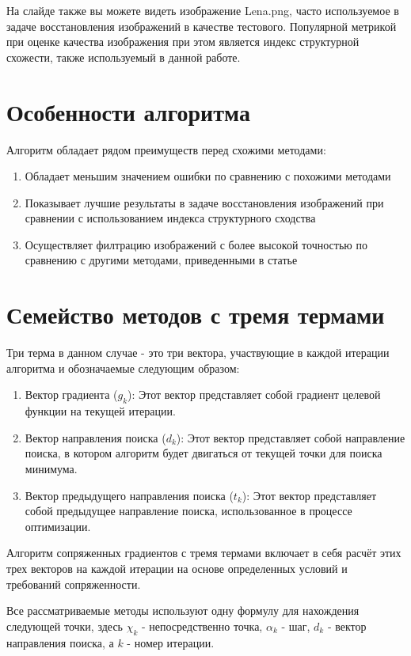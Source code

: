 На слайде также вы можете видеть изображение Lena.png, часто используемое в
задаче восстановления изображений в качестве тестового. Популярной метрикой при
оценке качества изображения при этом является индекс структурной схожести, также
используемый в данной работе. 

\section{Особенности алгоритма}

Алгоритм обладает рядом преимуществ перед схожими методами:

\begin{enumerate}
    \item Обладает меньшим значением ошибки по сравнению с похожими методами
    \item Показывает лучшие результаты в задаче восстановления изображений при
    сравнении с использованием индекса структурного сходства
    \item Осуществляет филтрацию изображений с более высокой точностью по
    сравнению с другими методами, приведенными в статье
\end{enumerate}

\section{Семейство методов с тремя термами}
Три терма в данном случае - это три вектора, участвующие в каждой итерации
алгоритма и обозначаемые следующим образом:
\begin{enumerate}
    \item Вектор градиента ($g_{k}$): Этот вектор представляет собой градиент
    целевой функции на текущей итерации.
    \item Вектор направления поиска ($d_{k}$): Этот вектор представляет собой
    направление поиска, в котором алгоритм будет двигаться от текущей точки для
    поиска минимума.
    \item Вектор предыдущего направления поиска ($t_{k}$): Этот вектор
    представляет собой предыдущее направление поиска, использованное в процессе
    оптимизации.
\end{enumerate}
Алгоритм сопряженных градиентов с тремя термами включает в себя расчёт этих трех
векторов на каждой итерации на основе определенных условий и требований
сопряженности.

Все рассматриваемые методы используют одну формулу для нахождения следующей
точки, здесь $\chi_{k}$ - непосредственно точка, $\alpha_{k}$ - шаг, $d_{k}$ -
вектор направления поиска, а $k$ - номер итерации.

